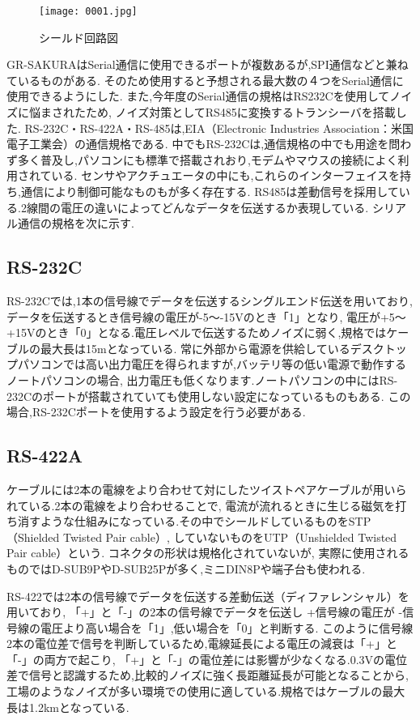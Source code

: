 \documentclass[12pt,oneside]{paper}
\begin{document}
\begin{figure}[H]
 \begin{center}
  \texttt{[image: 0001.jpg]}
 \end{center}
 \caption{シールド回路図}
 \label{fig:kairo1}
\end{figure}


GR-SAKURAはSerial通信に使用できるポートが複数あるが,SPI通信などと兼ねているものがある.
そのため使用すると予想される最大数の４つをSerial通信に使用できるようにした.
また,今年度のSerial通信の規格はRS232Cを使用してノイズに悩まされたため,
ノイズ対策としてRS485に変換するトランシーバを搭載した.
RS-232C・RS-422A・RS-485は,EIA（Electronic Industries Association：米国電子工業会）の通信規格である.
中でもRS-232Cは,通信規格の中でも用途を問わず多く普及し,パソコンにも標準で搭載されおり,モデムやマウスの接続によく利用されている.
センサやアクチュエータの中にも,これらのインターフェイスを持ち,通信により制御可能なものもが多く存在する.
RS485は差動信号を採用している.2線間の電圧の違いによってどんなデータを伝送するか表現している.
シリアル通信の規格を次に示す.


\subsection{RS-232C}
RS-232Cでは,1本の信号線でデータを伝送するシングルエンド伝送を用いており,データを伝送するとき信号線の電圧が-5～-15Vのとき「1」となり,
電圧が+5～+15Vのとき「0」となる.電圧レベルで伝送するためノイズに弱く,規格ではケーブルの最大長は15mとなっている.
常に外部から電源を供給しているデスクトップパソコンでは高い出力電圧を得られますが,バッテリ等の低い電源で動作するノートパソコンの場合,
出力電圧も低くなります.ノートパソコンの中にはRS-232Cのポートが搭載されていても使用しない設定になっているものもある.
この場合,RS-232Cポートを使用するよう設定を行う必要がある.

\subsection{RS-422A}
ケーブルには2本の電線をより合わせて対にしたツイストペアケーブルが用いられている.2本の電線をより合わせることで,
電流が流れるときに生じる磁気を打ち消すような仕組みになっている.その中でシールドしているものをSTP（Shielded Twisted Pair cable）,
していないものをUTP（Unshielded Twisted Pair cable）という. コネクタの形状は規格化されていないが,
実際に使用されるものではD-SUB9PやD-SUB25Pが多く,ミニDIN8Pや端子台も使われる.

RS-422では2本の信号線でデータを伝送する差動伝送（ディファレンシャル）を用いており,
「+」と「-」の2本の信号線でデータを伝送し +信号線の電圧が -信号線の電圧より高い場合を「1」,低い場合を「0」と判断する.
このように信号線2本の電位差で信号を判断しているため,電線延長による電圧の減衰は「+」と「-」の両方で起こり,
「+」と「-」の電位差には影響が少なくなる.0.3Vの電位差で信号と認識するため,比較的ノイズに強く長距離延長が可能となることから,
工場のようなノイズが多い環境での使用に適している.規格ではケーブルの最大長は1.2kmとなっている.
\end{document}
